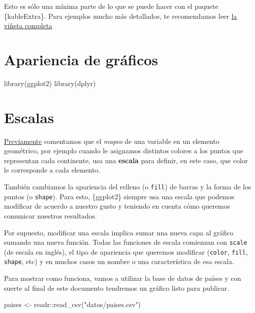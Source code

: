 \documentclass[
  openany]{book}
\newenvironment{Shaded}{\begin{snugshade}}{\end{snugshade}}
\newcommand{\FunctionTok}[1]{\textcolor[rgb]{0.00,0.00,0.00}{#1}}
\newcommand{\NormalTok}[1]{#1}
\newcommand{\OtherTok}[1]{\textcolor[rgb]{0.56,0.35,0.01}{#1}}
\newcommand{\SpecialCharTok}[1]{\textcolor[rgb]{0.00,0.00,0.00}{#1}}
\newcommand{\StringTok}[1]{\textcolor[rgb]{0.31,0.60,0.02}{#1}}
\begin{document}
Esto es sólo una mínima parte de lo que se puede hacer con el paquete \{kableExtra\}.
Para ejemplos mucho más detallados, te recomendamos leer \href{https://cran.r-project.org/web/packages/kableExtra/vignettes/awesome_table_in_html.html}{la viñeta completa}

\hypertarget{apariencia-de-gruxe1ficos}{%
\section{Apariencia de gráficos}\label{apariencia-de-gruxe1ficos}}

\begin{Shaded}
\begin{Highlighting}[]
\FunctionTok{library}\NormalTok{(ggplot2)}
\FunctionTok{library}\NormalTok{(dplyr)}
\end{Highlighting}
\end{Shaded}

\hypertarget{escalas}{%
\section{Escalas}\label{escalas}}

\href{06-graficos-I.html}{Previamente} comentamos que el \emph{mapeo} de una variable en un elemento geométrico, por ejemplo cuando le asignamos distintos colores a los puntos que representan cada continente, usa una \textbf{escala} para definir, en este caso, que color le corresponde a cada elemento.

También cambiamos la apariencia del relleno (o \texttt{fill}) de barras y la forma de los puntos (o \texttt{shape}).
Para esto, \{ggplot2\} siempre usa una escala que podemos modificar de acuerdo a nuestro gusto y teniendo en cuenta cómo queremos comunicar nuestros resultados.

Por supuesto, modificar una escala implica sumar una nueva capa al gráfico sumando una nueva función.
Todas las funciones de escala comienzan con \texttt{scale} (de escala en inglés), el tipo de apariencia que queremos modificar (\texttt{color}, \texttt{fill}, \texttt{shape}, etc) y en muchos casos un nombre o una característica de esa escala.

Para mostrar como funciona, vamos a utilizar la base de datos de países y con suerte al final de este documento tendremos un gráfico listo para publicar.

\begin{Shaded}
\begin{Highlighting}[]
\NormalTok{paises }\OtherTok{\textless{}{-}}\NormalTok{ readr}\SpecialCharTok{::}\FunctionTok{read\_csv}\NormalTok{(}\StringTok{"datos/paises.csv"}\NormalTok{)}
\end{Highlighting}
\end{Shaded}
\end{document}
